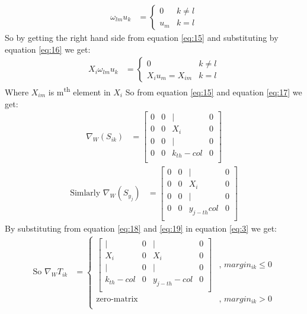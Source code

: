 \documentclass[]{article}
\begin{document}
\begin{align}
\omega_{lm} u_k &= \begin{cases}
0 & k \ne l \\
u_m & k = l
\end{cases} \label{eq:16}
\end{align}
So by getting the right hand side from equation \eqref{eq:15} and substituting by equation \eqref{eq:16} we get: 
\begin{align}
X_i \omega_{lm} u_k &= \begin{cases}
0 & k \ne l \\
X_i u_m = X_{im} & k = l
\end{cases} \label{eq:17}
\end{align} 
Where $X_{im}$ is m\textsuperscript{th} element in $X_i$ \newline
So from equation \eqref{eq:15} and equation \eqref{eq:17} we get:
\begin{align}
	\nabla_W \left( S_{ik} \right) &= \left[\begin{array}{cccc}
	0 & 0 & | & 0 \\
	0 & 0 & X_i & 0 \\
	0 & 0 & | & 0 \\
	0 & 0 & k_{th}-col & 0 \\
	\end{array}\right] \label{eq:18}
\end{align}
\begin{align}
	\text{Simlarly } \nabla_W \left( S_{y_j} \right) &= \left[\begin{array}{cccc}
	0 & 0 & | & 0 \\
	0 & 0 & X_i & 0 \\
	0 & 0 & | & 0 \\
	0 & 0 & y_{j-th} col & 0 \\
	\end{array}\right] \label{eq:19}
\end{align}
By substituting from equation \eqref{eq:18} and \eqref{eq:19} in equation \eqref{eq:3} we get:
\begin{align}
	\text{So } \nabla_W T_{ik} &= \begin{cases}
	\left[\begin{array}{cccc}
	| & 0 & | & 0 \\
	X_i & 0 & X_i & 0 \\
	| & 0 & | & 0 \\
	k_{th}-col & 0 & y_{j-th}-col & 0 \\
	\end{array}\right] & \text{, } margin_{ik} \le 0 \\
	\text{zero-matrix} & \text{, } margin_{ik} > 0 \\
	\end{cases} \label{eq:20}
\end{align}
\end{document}
